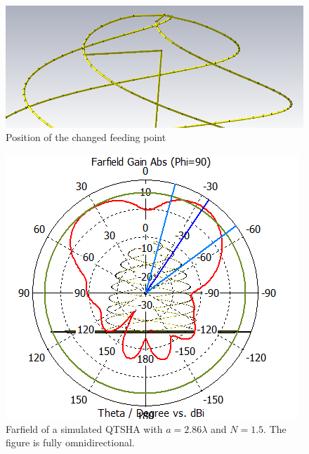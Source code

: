 \begin{figure}[H]
\centering 
\includegraphics[scale = 0.5]{figures/antennas/hemispherical/hemispherical_feed}
\caption{Position of the changed feeding point}
\label{fig:SHA_feed}
\end{figure}

\begin{figure}[H]
\centering 
\includegraphics[scale = 0.7]{figures/antennas/hemispherical/hemispherical_farfield3}
\caption{Farfield of a simulated QTSHA with $a=2.86\lambda$ and $N=1.5$. The figure is fully omnidirectional.}
\label{fig:SHA_ff3}
\end{figure}  

